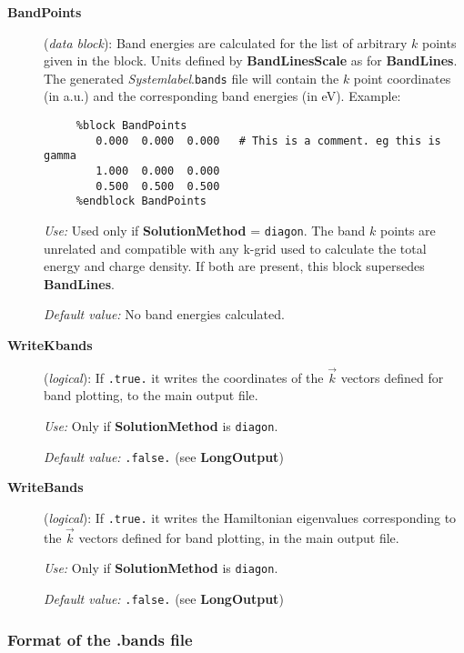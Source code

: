 \documentclass[11pt]{article}
\begin{document}
\begin{description}
\item[{\bf BandPoints}] ({\it data block}):
Band energies are calculated for the list of arbitrary $k$ points
given in the block. Units defined by {\bf BandLinesScale} as
for {\bf BandLines}. The generated {\it Systemlabel}.{\tt bands} file
will contain the $k$ point coordinates (in a.u.) and the corresponding
band energies (in eV). Example:

\begin{verbatim}
     %block BandPoints
        0.000  0.000  0.000   # This is a comment. eg this is gamma
        1.000  0.000  0.000
        0.500  0.500  0.500
     %endblock BandPoints
\end{verbatim}

{\it Use:} Used only if {\bf SolutionMethod} = {\tt diagon}.
The band $k$ points are unrelated and compatible with any k-grid used
to calculate the total energy and charge density. If both are present, this
block supersedes {\bf BandLines}.

{\it Default value:} No band energies calculated.

\item[{\bf WriteKbands}] ({\it logical}):
If {\tt .true.} it writes the coordinates of the $\vec k$ vectors
defined for band plotting, to the main output file.

{\it Use:} Only if {\bf SolutionMethod} is {\tt diagon}.

{\it Default value:} {\tt .false.} (see {\bf LongOutput})


\item[{\bf WriteBands}] ({\it logical}):  If {\tt .true.} it
  writes the Hamiltonian eigenvalues corresponding to the $\vec k$
  vectors defined for band plotting, in the main output file.

{\it Use:} Only if {\bf SolutionMethod} is {\tt diagon}.

{\it Default value:} {\tt .false.} (see {\bf LongOutput})


\end{description}

\subsubsection{Format of the .bands file}
\end{document}
